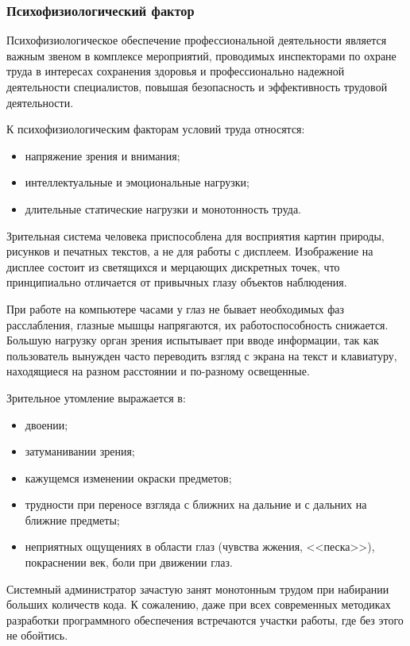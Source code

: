 \subsubsection{Психофизиологический фактор}

Психофизиологическое обеспечение профессиональной деятельности является важным звеном в комплексе мероприятий, проводимых инспекторами по охране труда в интересах сохранения здоровья и профессионально надежной деятельности специалистов, повышая безопасность и эффективность трудовой деятельности. 

К психофизиологическим факторам условий труда относятся: 

\begin{itemize}
  \item напряжение зрения и внимания;
  \item интеллектуальные и эмоциональные нагрузки;
  \item длительные статические нагрузки и монотонность труда.
\end{itemize}

Зрительная система человека приспособлена для восприятия картин природы, рисунков и печатных текстов, а не для работы с дисплеем. Изображение на дисплее состоит из светящихся и мерцающих дискретных точек, что принципиально отличается от привычных глазу объектов наблюдения.

При работе на компьютере часами у глаз не бывает необходимых фаз расслабления, глазные мышцы напрягаются, их работоспособность снижается. Большую нагрузку орган зрения испытывает при вводе информации, так как пользователь вынужден часто переводить взгляд с экрана на текст и клавиатуру, находящиеся на разном расстоянии и по-разному освещенные. 

Зрительное утомление выражается в:

\begin{itemize}
  \item двоении;
  \item затуманивании зрения;
  \item кажущемся изменении окраски предметов;
  \item трудности при переносе взгляда с ближних на дальние и с дальних на ближние предметы;
  \item неприятных ощущениях в области глаз (чувства жжения, <<песка>>), покраснении век, боли при движении глаз.
\end{itemize}

Системный администратор зачастую занят монотонным трудом при набирании больших количеств кода. К сожалению, даже при всех современных методиках разработки программного обеспечения встречаются участки работы, где без этого не обойтись. 

